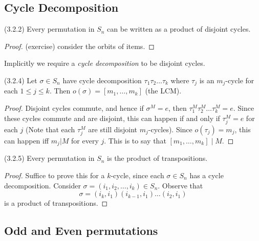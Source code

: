 
\subsection{Cycle Decomposition}
\begin{theorem}
	(3.2.2)
	Every permutation in $S_n$ can be written as a product of disjoint cycles.
\end{theorem}
\begin{proof}
	(exercise) consider the orbits of items.
\end{proof}

Implicitly we require a  \textit{cycle decomposition} to be disjoint cycles.

\begin{theorem}
	(3.2.4)
	Let $\sigma \in S_n$ have cycle decomposition $\tau_1\tau_2\ldots\tau_k$ where $\tau_j$ is an $m_j$-cycle for each $1\le j\le k$. Then $o(\sigma) = [m_1,\ldots,m_k]$ (the LCM).
\end{theorem}
\begin{proof}
	Disjoint cycles commute, and hence if $\sigma^M = e$, then $\tau_1^M \tau_2^M \ldots\tau_k^M = e$. Since these cycles commute and are disjoint, this can happen if and only if $\tau_j^M = e$ for each $j$ (Note that each $\tau_j^M$ are still disjoint $m_j$-cycles).
	Since $o(\tau_j) = m_j$, this can happen iff $m_j | M$ for every $j$. This is to say that $[m_1,\ldots,m_k] \mid M$.
\end{proof}

\begin{theorem}
	(3.2.5)
	Every permutation in $S_n$ is the product of transpositions.
\end{theorem}
\begin{proof}
	Suffice to prove this for a $k$-cycle, since each $\sigma \in S_n$ has a cycle decomposition. 
	Consider $\sigma = (i_1,i_2,\ldots,i_k) \in S_n$. Observe that \[
		\sigma = (i_k, i_1)(i_{k-1},i_1)\ldots(i_2,i_1)
	\]
	is a product of transpositions.
\end{proof}

\subsection{Odd and Even permutations}

